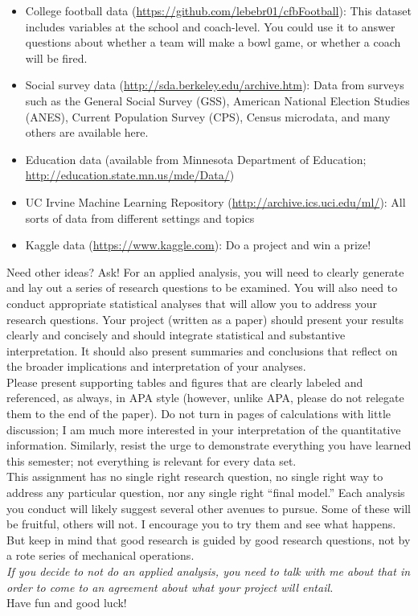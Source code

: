 \documentclass[]{article}
\begin{document}
\begin{itemize}
\item College football data (\url{https://github.com/lebebr01/cfbFootball}): This dataset includes variables at the school and coach-level. You could use it to answer questions about whether a team will make a bowl game, or whether a coach will be fired.
\item Social survey data (\url{http://sda.berkeley.edu/archive.htm}): Data from surveys such as the General Social Survey (GSS), American National Election Studies (ANES), Current Population Survey (CPS), Census microdata, and many others are available here.
\item Education data (available from Minnesota Department of Education; \url{http://education.state.mn.us/mde/Data/})
\item UC Irvine Machine Learning Repository (\url{http://archive.ics.uci.edu/ml/}): All sorts of data from different settings and topics
\item Kaggle data (\url{https://www.kaggle.com}): Do a project and win a prize!
\end{itemize}

\noindent Need other ideas? Ask! For an applied analysis, you will need to clearly generate and lay out a series of research questions to be examined. You will also need to conduct appropriate statistical analyses that will allow you to address your research questions. Your project (written as a paper) should present your results clearly and concisely and should integrate statistical and substantive interpretation. It should also present summaries and conclusions that reflect on the broader implications and interpretation of your analyses.\\
\linebreak
Please present supporting tables and figures that are clearly labeled and referenced, as always, in APA style (however, unlike APA, please do not relegate them to the end of the paper). Do not turn in pages of calculations with little discussion; I am much more interested in your interpretation of the quantitative information. Similarly, resist the urge to demonstrate everything you have learned this semester; not everything is relevant for every data set.\\
\linebreak
This assignment has no single right research question, no single right way to address any particular question, nor any single right ``final model.'' Each analysis you conduct will likely suggest several other avenues to pursue. Some of these will be fruitful, others will not. I encourage you to try them and see what happens. But keep in mind that good research is guided by good research questions, not by a rote series of mechanical operations. 
\\ \linebreak
\noindent\textit{If you decide to not do an applied analysis, you need to talk with me about that in order to come to an agreement about what your project will entail.}
\\ \linebreak
Have fun and good luck!
\end{document}
